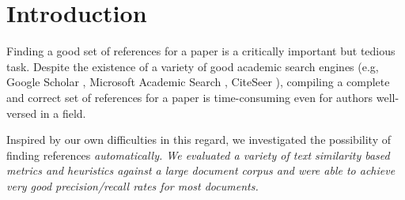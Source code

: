 \section{Introduction}
\label{sec:intro}

Finding a good set of references for a paper is a critically important 
but tedious task.  Despite the existence of a variety of good academic
search engines (e.g, Google Scholar \cite{scholar}, 
Microsoft Academic Search \cite{ms}, CiteSeer \cite{citeseer}), compiling
a complete and correct set of references for a paper is time-consuming
even for authors well-versed in a field.

Inspired by our own difficulties in this regard, we investigated the
possibility of finding references \it{automatically}.  We evaluated
a variety of text similarity based metrics and heuristics against a 
large document corpus and were able to achieve very good precision/recall
rates for most documents.


